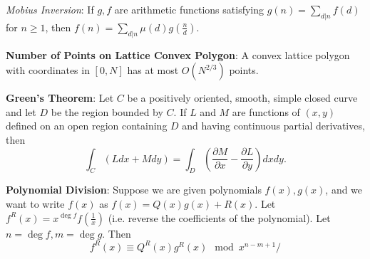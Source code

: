 \emph{Mobius Inversion}: If $g,f$ are arithmetic functions satisfying $\displaystyle g(n) = \sum_{d | n}f(d)$ for $n \geq 1$, then $\displaystyle f(n) = \sum_{d|n}\mu(d)g(\frac{n}{d})$.

\textbf{Number of Points on Lattice Convex Polygon}: A convex lattice polygon with coordinates in $[0,N]$ has at most $O(N^{2/3})$ points.

\textbf{Green's Theorem}: Let $C$ be a positively oriented, smooth, simple closed curve and let $D$ be the region bounded by $C$. If $L$ and $M$ are functions of $(x,y)$ defined on an open region containing $D$ and having continuous partial derivatives, then
\begin{equation*}
  \int_C (Ldx + Mdy) = \int_D(\frac{\partial M}{\partial x}-\frac{\partial L}{\partial y}) dxdy.
\end{equation*}

\textbf{Polynomial Division}: Suppose we are given polynomials $f(x), g(x)$, and we want to write $f(x)$ as $f(x) = Q(x)g(x) + R(x)$. Let $f^R(x) = x^{\deg f}f(\frac{1}{x})$ (i.e. reverse the coefficients of the polynomial). Let $n = \deg f, m = \deg g$. Then
\begin{equation*}
  f^R(x) \equiv Q^R(x) g^R(x) \mod x^{n-m+1}/
\end{equation*}
